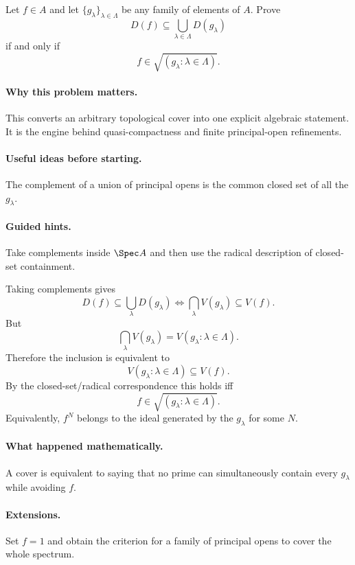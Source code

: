 \begin{problem}
Let $f\in A$ and let $\{g_\lambda\}_{\lambda\in\Lambda}$ be any family of elements of $A$.
Prove
\[
D(f)\subseteq\bigcup_{\lambda\in\Lambda}D(g_\lambda)
\]
if and only if
\[
f\in\sqrt{(g_\lambda:\lambda\in\Lambda)}.
\]
\end{problem}

\paragraph{Why this problem matters.}
This converts an arbitrary topological cover into one explicit algebraic statement.  It is
the engine behind quasi-compactness and finite principal-open refinements.

\paragraph{Useful ideas before starting.}
The complement of a union of principal opens is the common closed set of all the
$g_\lambda$.

\paragraph{Guided hints.}
Take complements inside $\Spec A$ and then use the radical description of closed-set
containment.

\begin{solution}
Taking complements gives
\[
D(f)\subseteq\bigcup_\lambda D(g_\lambda)
\iff
\bigcap_\lambda V(g_\lambda)\subseteq V(f).
\]
But
\[
\bigcap_\lambda V(g_\lambda)
=
V(g_\lambda:\lambda\in\Lambda).
\]
Therefore the inclusion is equivalent to
\[
V(g_\lambda:\lambda\in\Lambda)\subseteq V(f).
\]
By the closed-set/radical correspondence this holds iff
\[
f\in\sqrt{(g_\lambda:\lambda\in\Lambda)}.
\]
Equivalently, $f^N$ belongs to the ideal generated by the $g_\lambda$ for some $N$.
\end{solution}

\paragraph{What happened mathematically.}
A cover is equivalent to saying that no prime can simultaneously contain every $g_\lambda$
while avoiding $f$.

\paragraph{Extensions.}
Set $f=1$ and obtain the criterion for a family of principal opens to cover the whole
spectrum.
